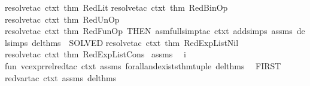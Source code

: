 \begin{isabellebody}
resolve{\isacharunderscore}{\kern0pt}tac\ ctxt\ {\isacharbrackleft}{\kern0pt}{\isacharat}{\kern0pt}{\isacharbraceleft}{\kern0pt}thm\ RedLit{\isacharbraceright}{\kern0pt}{\isacharbrackright}{\kern0pt}{\isacharcomma}{\kern0pt}\isanewline
resolve{\isacharunderscore}{\kern0pt}tac\ ctxt\ {\isacharbrackleft}{\kern0pt}{\isacharat}{\kern0pt}{\isacharbraceleft}{\kern0pt}thm\ RedBinOp{\isacharbraceright}{\kern0pt}{\isacharbrackright}{\kern0pt}{\isacharcomma}{\kern0pt}\isanewline
resolve{\isacharunderscore}{\kern0pt}tac\ ctxt\ {\isacharbrackleft}{\kern0pt}{\isacharat}{\kern0pt}{\isacharbraceleft}{\kern0pt}thm\ RedUnOp{\isacharbraceright}{\kern0pt}{\isacharbrackright}{\kern0pt}{\isacharcomma}{\kern0pt}\isanewline
resolve{\isacharunderscore}{\kern0pt}tac\ ctxt\ {\isacharbrackleft}{\kern0pt}{\isacharat}{\kern0pt}{\isacharbraceleft}{\kern0pt}thm\ RedFunOp{\isacharbraceright}{\kern0pt}{\isacharbrackright}{\kern0pt}\ THEN{\isacharprime}{\kern0pt}\ {\isacharparenleft}{\kern0pt}asm{\isacharunderscore}{\kern0pt}full{\isacharunderscore}{\kern0pt}simp{\isacharunderscore}{\kern0pt}tac\ {\isacharparenleft}{\kern0pt}ctxt\ addsimps\ assms\ delsimps\ del{\isacharunderscore}{\kern0pt}thms{\isacharparenright}{\kern0pt}\ {\isacharbar}{\kern0pt}{\isachargreater}{\kern0pt}\ SOLVED{\isacharprime}{\kern0pt}{\isacharparenright}{\kern0pt}{\isacharcomma}{\kern0pt}\isanewline
resolve{\isacharunderscore}{\kern0pt}tac\ ctxt\ {\isacharbrackleft}{\kern0pt}{\isacharat}{\kern0pt}{\isacharbraceleft}{\kern0pt}thm\ RedExpListNil{\isacharbraceright}{\kern0pt}{\isacharbrackright}{\kern0pt}{\isacharcomma}{\kern0pt}\isanewline
resolve{\isacharunderscore}{\kern0pt}tac\ ctxt\ {\isacharbrackleft}{\kern0pt}{\isacharat}{\kern0pt}{\isacharbraceleft}{\kern0pt}thm\ RedExpListCons{\isacharbraceright}{\kern0pt}{\isacharbrackright}{\kern0pt}\isanewline
{\isacharbrackright}{\kern0pt}{\isacharparenright}{\kern0pt}\ assms\ {\isacharparenright}{\kern0pt}\isanewline
{\isacharparenright}{\kern0pt}\ i{\isacharparenright}{\kern0pt}\isanewline
\isanewline
fun\ vc{\isacharunderscore}{\kern0pt}expr{\isacharunderscore}{\kern0pt}rel{\isacharunderscore}{\kern0pt}red{\isacharunderscore}{\kern0pt}tac\ ctxt\ assms\ forall{\isacharunderscore}{\kern0pt}and{\isacharunderscore}{\kern0pt}exists{\isacharunderscore}{\kern0pt}thm{\isacharunderscore}{\kern0pt}tuple\ del{\isacharunderscore}{\kern0pt}thms\ {\isacharequal}{\kern0pt}\ \isanewline
FIRST{\isacharprime}{\kern0pt}\ {\isacharbrackleft}{\kern0pt}\isanewline
red{\isacharunderscore}{\kern0pt}var{\isacharunderscore}{\kern0pt}tac\ ctxt\ assms\ del{\isacharunderscore}{\kern0pt}thms{\isacharcomma}{\kern0pt}\isanewline

\end{isabellebody}
